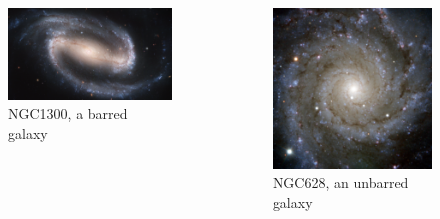 \documentclass{beamer}
\begin{document}
\begin{frame}{}
        \begin{columns}
        \begin{column}{0.45\textwidth}
        \begin{figure}
            \centering
            \includegraphics[width=\textwidth]{Figures/NGC1300.png}
            \caption{NGC1300, a barred galaxy}
            \label{fig:1300}
        \end{figure}
        \end{column}
        \begin{column}{0.45\textwidth}
        \begin{figure}
            \centering
            \includegraphics[width=\textwidth]{Figures/NGC638.png}
            \caption{NGC628, an unbarred galaxy}
            \label{fig:628}
        \end{figure}
        
        \end{column}
        \end{columns}
\end{frame}
\end{document}
